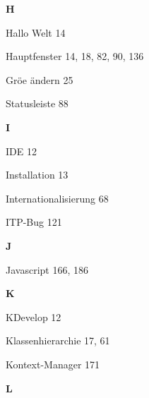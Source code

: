 \documentclass{book}
\renewcommand\indexspace{\vspace{11pt}}
\renewcommand\subitem{\par}
\begin{document}
\begin{multicols}{2}
\begin{osp-index}
  \indexspace
{\sffamily\bfseries H}\nopagebreak

  \item Hallo Welt\hspace{1mm} 14
  \item Hauptfenster\hspace{1mm} 14, 18, 82, 90, 136
    \subitem Gr\"o\IeC {\ss }e \"andern\hspace{1mm} 25
    \subitem Statusleiste\hspace{1mm} 88

  \indexspace
{\sffamily\bfseries I}\nopagebreak

  \item IDE\hspace{1mm} 12
  \item Installation\hspace{1mm} 13
  \item Internationalisierung\hspace{1mm} 68
  \item ITP-Bug\hspace{1mm} 121

  \indexspace
{\sffamily\bfseries J}\nopagebreak

  \item Javascript\hspace{1mm} 166, 186

  \indexspace
{\sffamily\bfseries K}\nopagebreak

  \item KDevelop\hspace{1mm} 12
  \item Klassenhierarchie\hspace{1mm} 17, 61
  \item Kontext-Manager\hspace{1mm} 171

  \indexspace
{\sffamily\bfseries L}\nopagebreak


\end{osp-index}
\end{multicols}
\end{document}
